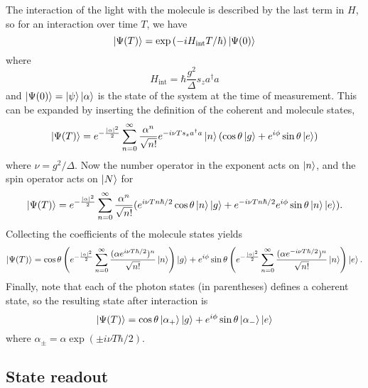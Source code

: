 The interaction of the light with the molecule is described by the last term in
$H$, so for an interaction over time $T$, we have
%
\begin{equation}
  \ket{\Psi(T)} = \exp\left(-iH_\text{int}T/\hbar\right)\ket{\Psi(0)}
\end{equation}
%
where
%
\begin{equation}
  H_\text{int} = \hbar \frac{g^2}{\Delta} s_z a^\dagger a
\end{equation}
%
and $\ket{\Psi(0)} = \ket{\psi}\ket{\alpha}$ is the state of the system at the
time of measurement. This can be expanded by inserting the definition of the
coherent and molecule states,
%
\begin{equation}
  \ket{\Psi(T)} = e^{-\frac{|\alpha|^2}{2}}\sum_{n=0}^\infty
   \frac{\alpha^n}{\sqrt{n!}} e^{-i\nu T s_z a^\dagger a} \ket{n} (\cos\theta
   \ket{g} + e^{i\phi}\sin\theta\ket{e})
   \label{mws:eqn:evolve1}
\end{equation}
%
where $\nu = g^2/\Delta$.
Now the number operator in the exponent acts on $\ket{n}$, and the spin
operator acts on $\ket{N}$ for
%
\begin{equation}
   \ket{\Psi(T)} = e^{-\frac{|\alpha|^2}{2}}\sum_{n=0}^\infty
   \frac{\alpha^n}{\sqrt{n!}} (e^{i\nu T n \hbar/2}\cos\theta\ket{n}\ket{g} +
   e^{-i\nu T n \hbar/2}e^{i\phi}\sin\theta\ket{n}\ket{e}).
\end{equation}
%
Collecting the coefficients of the molecule states yields
%
\begin{equation}
  \ket{\Psi(T)} = \cos\theta\left(e^{-\frac{|\alpha|^2}{2}}\sum_{n=0}^\infty
   \frac{(\alpha e^{i\nu T \hbar/2})^n}{\sqrt{n!}}\ket{n}\right)\ket{g} +  
    e^{i\phi}\sin\theta\left(e^{-\frac{|\alpha|^2}{2}}\sum_{n=0}^\infty
   \frac{(\alpha e^{-i\nu T \hbar/2})^n}{\sqrt{n!}}\ket{n}\right)\ket{e}.
\end{equation}
%
Finally, note that each of the photon states (in parentheses) defines a
coherent state, so the resulting state after interaction is
%
\begin{equation}
  \ket{\Psi(T)} = \cos\theta\ket{\alpha_+}\ket{g} +
  e^{i\phi}\sin\theta\ket{\alpha_-}\ket{e}
  \label{mws:eqn:entangled}
\end{equation}
%
where $\alpha_\pm = \alpha \exp(\pm i \nu T \hbar/2)$.

\subsection{State readout}
\label{mws:readout}

